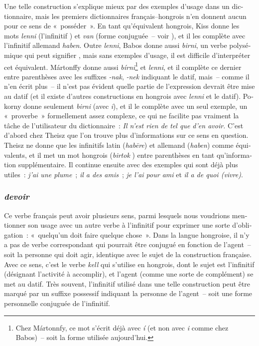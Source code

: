 \documentclass[output=paper,colorlinks,citecolor=brown,arabicfont,chinesefont,booklanguage=french]{langscibook}
\begin{document}
\begin{otherlanguage}{french}
Une telle construction s’explique mieux par des exemples d’usage dans un dictionnaire, mais les premiers dictionnaires français–hongrois n’en donnent aucun pour ce sens de «~posséder~». En tant qu’équivalent hongrois, Kiss donne les mots \emph{lenni} (l’infinitif ) et \emph{van} (forme conjuguée~-- voir ), et il les complète avec l’infinitif allemand \emph{haben}. Outre \emph{lenni}, Babos donne aussi \emph{birni}, un verbe polysémique qui peut signifier , mais sans exemples d’usage, il est difficile d’interpréter cet équivalent. Mártonffy donne aussi \emph{bírni}\footnote{Chez Mártonnfy, ce mot s’écrit déjà avec \emph{í} (et non avec \emph{i} comme chez Babos)~-- soit la forme utilisée aujourd’hui.} et \emph{lenni}, et il complète ce dernier entre parenthèses avec les suffixes \emph{-nak}, \emph{-nek} indiquant le datif, mais~-- comme il n’en écrit plus~-- il n’est pas évident quelle partie de l’expression devrait être mise au datif (et il existe d’autres constructions en hongrois avec \emph{lenni} et le datif). Pokorny donne seulement \emph{birni} (avec \emph{i}), et il le complète avec un seul exemple, un «~proverbe~» formellement assez complexe, ce qui ne facilite pas vraiment la tâche de l’utilisateur du dictionnaire~: \emph{Il n’est rien de tel que d’en avoir.} C’est d’abord chez Theisz que l’on trouve plus d’informations sur ce sens en question. Theisz ne donne que les infinitifs latin (\emph{habēre}) et allemand (\emph{haben}) comme équivalents, et il met un mot hongrois (\emph{birtok} ) entre parenthèses en tant qu’information supplémentaire. Il continue ensuite avec des exemples qui sont déjà plus utiles~: \emph{j’ai une plume}~; \emph{il a des amis}~; \emph{je l’ai pour ami} et \emph{il a de quoi (vivre)}.

\subsubsection{\textit{devoir}}

Ce verbe français peut avoir plusieurs sens, parmi lesquels nous voudrions mentionner son usage avec un autre verbe à l’infinitif pour exprimer une sorte d’obligation~: «~quelqu’un doit faire quelque chose~». Dans la langue hongroise, il n’y a pas de verbe correspondant qui pourrait être conjugué en fonction de l’agent~-- soit la personne qui doit agir, identique avec le sujet de la construction française. Avec ce sens, c’est le verbe \emph{kell} qui s’utilise en hongrois, dont le sujet est l’infinitif (désignant l’activité à accomplir), et l’agent (comme une sorte de complément) se met au datif. Très souvent, l’infinitif utilisé dans une telle construction peut être marqué par un suffixe possessif indiquant la personne de l’agent~-- soit une forme personnelle conjuguée de l’infinitif. 


\end{otherlanguage}
\end{document}
